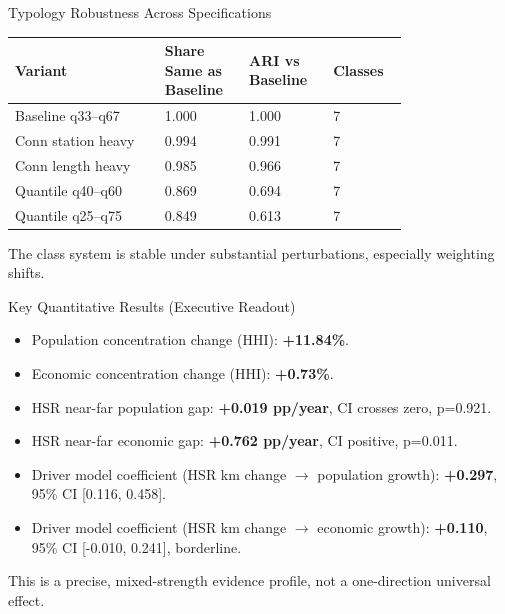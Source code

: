 \documentclass[aspectratio=169]{beamer}
\begin{document}
\begin{frame}{Typology Robustness Across Specifications}
\small
\begin{table}
\centering
\begin{tabular}{p{0.32\linewidth} p{0.16\linewidth} p{0.16\linewidth} p{0.14\linewidth}}
\toprule
Variant & Share Same as Baseline & ARI vs Baseline & Classes \\
\midrule
Baseline q33--q67 & 1.000 & 1.000 & 7 \\
Conn station heavy & 0.994 & 0.991 & 7 \\
Conn length heavy & 0.985 & 0.966 & 7 \\
Quantile q40--q60 & 0.869 & 0.694 & 7 \\
Quantile q25--q75 & 0.849 & 0.613 & 7 \\
\bottomrule
\end{tabular}
\end{table}
\smallskip
The class system is stable under substantial perturbations, especially weighting shifts.
\end{frame}

\begin{frame}{Key Quantitative Results (Executive Readout)}
\small
\begin{itemize}
  \item Population concentration change (HHI): \textbf{+11.84\%}.
  \item Economic concentration change (HHI): \textbf{+0.73\%}.
  \item HSR near-far population gap: \textbf{+0.019 pp/year}, CI crosses zero, p=0.921.
  \item HSR near-far economic gap: \textbf{+0.762 pp/year}, CI positive, p=0.011.
  \item Driver model coefficient (HSR km change $\rightarrow$ population growth): \textbf{+0.297}, 95\% CI [0.116, 0.458].
  \item Driver model coefficient (HSR km change $\rightarrow$ economic growth): \textbf{+0.110}, 95\% CI [-0.010, 0.241], borderline.
\end{itemize}
\vspace{0.3em}
This is a precise, mixed-strength evidence profile, not a one-direction universal effect.
\end{frame}
\end{document}
